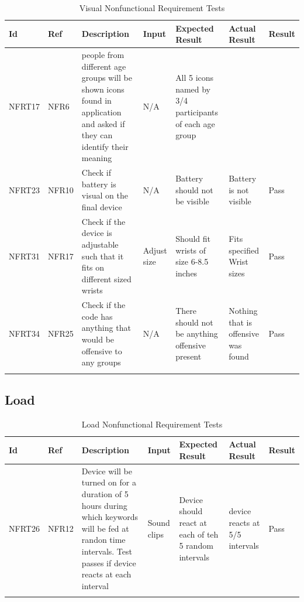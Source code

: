 \documentclass[12pt, titlepage]{article}
\begin{document}
\begin{longtable}{|p{1.4cm}|p{1.4cm}|p{3cm}|p{1.5cm}|p{2.5cm}|p{2cm}|p{1.2cm}|}
  \endfirsthead
  \endhead
  \hline
  \textbf{Id} & \textbf{Ref} & \textbf{Description}                                                         & \textbf{Input}                                    & \textbf{Expected Result}    & \textbf{Actual Result}                          & \textbf{Result}                                     \\ \hline
  NFRT17        &  NFR6         & people from different age groups will be shown icons found in application and asked if they can identify their meaning                   & N/A    & All 5 icons named by 3/4 participants of each age group    &    & \cellcolor[HTML]{FFFFFF}{\color[HTML]{F8A102} TBD}                         \\ \hline
  NFRT23        &  NFR10        & Check if battery is visual on the final device             & N/A      & Battery should not be visible          & Battery is not visible       & {\color[HTML]{32CB00} Pass}                         \\ \hline
  NFRT31        &  NFR17        & Check if the device is adjustable such that it fits on different sized wrists            & Adjust size      & Should fit wrists of size 6-8.5 inches          & Fits specified Wrist sizes       & {\color[HTML]{32CB00} Pass}                         \\ \hline
  NFRT34        &  NFR25        & Check if the code has anything that would be offensive to any groups             & N/A      & There should not be anything offensive present          & Nothing that is offensive was found       & {\color[HTML]{32CB00} Pass}                         \\ \hline
  \caption{Visual Nonfunctional Requirement Tests}
  \label{VisualNonfunctionalRequirementTests}
\end{longtable}


\subsection{Load}

\begin{longtable}{|p{1.4cm}|p{1.4cm}|p{3cm}|p{1.5cm}|p{2.5cm}|p{2cm}|p{1.2cm}|}

  \endfirsthead
  \endhead
  \hline
  \textbf{Id} & \textbf{Ref} & \textbf{Description}                                                         & \textbf{Input}                                    & \textbf{Expected Result}    & \textbf{Actual Result}                          & \textbf{Result}                                     \\ \hline
  NFRT26        & NFR12          & Device will be turned on for a duration of 5 hours during which keywords will be fed at randon time intervals. Test passes if device reacts at each interval                & Sound clips       & Device should react at each of teh 5 random intervals        & device reacts at 5/5 intervals      & {\color[HTML]{32CB00} Pass}                         \\ \hline
  \caption{Load Nonfunctional Requirement Tests}
  \label{LoadNonfunctionalRequirementTests}
\end{longtable}
\end{document}
